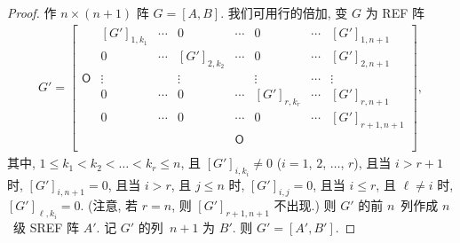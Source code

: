 \documentclass[../libro.tex]{subfiles}
\begin{document}
\begin{proof}
    作 \(n \times (n + 1)\) 阵 \(G = [A, B]\).
    我们可用行的倍加, 变 \(G\) 为 REF 阵
    \begin{align*}
        G' =
        \begin{bmatrix}
            {}         & [G']_{1,k_1} & \cdots & 0            & \cdots     & 0            & \cdots & [G']_{1,n+1}   \\
            {}         & 0            & \cdots & [G']_{2,k_2} & \cdots     & 0            & \cdots & [G']_{2,n+1}   \\
            \mathsf{O} & \vdots       & {}     & \vdots       & {}         & \vdots       & \cdots & \vdots         \\
            {}         & 0            & \cdots & 0            & \cdots     & [G']_{r,k_r} & \cdots & [G']_{r,n+1}   \\
            {}         & 0            & \cdots & 0            & \cdots     & 0            & \cdots & [G']_{r+1,n+1} \\
            {}         & {}           & {}     & {}           & \mathsf{O} & {}           & {}     & {}             \\
        \end{bmatrix},
    \end{align*}
    其中,
    \(1 \leq k_1 < k_2 < \dots < k_r \leq n\),
    且 \([G']_{i,k_i} \neq 0\)
    (\(i = 1\), \(2\), \(\dots\), \(r\)),
    且当 \(i > r + 1\) 时, \([G']_{i,n+1} = 0\),
    且当 \(i > r\), 且 \(j \leq n\) 时,
    \([G']_{i,j} = 0\),
    且当 \(i \leq r\), 且 \(\ell \neq i\) 时,
    \([G']_{\ell,k_i} = 0\).
    (注意, 若 \(r = n\), 则 \([G']_{r+1,n+1}\) 不出现.)
    则 \(G'\) 的前 \(n\)~列作成 \(n\)~级 SREF 阵 \(A'\).
    记 \(G'\) 的列~\(n+1\) 为 \(B'\).
    则 \(G' = [A', B']\).


\end{proof}
\end{document}
